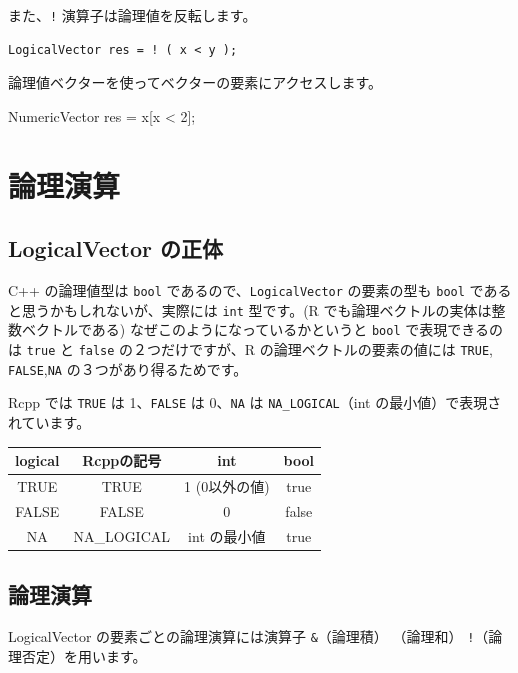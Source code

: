 \documentclass[]{book}
\newenvironment{Shaded}{\begin{snugshade}}{\end{snugshade}}
\newcommand{\DecValTok}[1]{\textcolor[rgb]{0.00,0.00,0.81}{#1}}
\newcommand{\NormalTok}[1]{#1}
\begin{document}
また、\texttt{!} 演算子は論理値を反転します。

\begin{verbatim}
LogicalVector res = ! ( x < y );
\end{verbatim}

論理値ベクターを使ってベクターの要素にアクセスします。

\begin{Shaded}
\begin{Highlighting}[]
\NormalTok{NumericVector res = x[x < }\DecValTok{2}\NormalTok{];}
\end{Highlighting}
\end{Shaded}

\chapter{論理演算}

\hypertarget{logicalvector-}{%
\section{LogicalVector の正体}\label{logicalvector-}}

C++ の論理値型は \texttt{bool} であるので、\texttt{LogicalVector} の要素の型も \texttt{bool} であると思うかもしれないが、実際には \texttt{int} 型です。(R でも論理ベクトルの実体は整数ベクトルである) なぜこのようになっているかというと \texttt{bool} で表現できるのは \texttt{true} と \texttt{false} の２つだけですが、R の論理ベクトルの要素の値には \texttt{TRUE}, \texttt{FALSE},\texttt{NA} の３つがあり得るためです。

Rcpp では \texttt{TRUE} は 1、\texttt{FALSE} は 0、\texttt{NA} は \texttt{NA\_LOGICAL}（int の最小値）で表現されています。

\begin{longtable}[]{@{}cccc@{}}
\toprule
logical & Rcppの記号 & int & bool\tabularnewline
\midrule
\endhead
TRUE & TRUE & 1 (0以外の値) & true\tabularnewline
FALSE & FALSE & 0 & false\tabularnewline
NA & NA\_LOGICAL & int の最小値 & true\tabularnewline
\bottomrule
\end{longtable}

\hypertarget{-1}{%
\section{論理演算}\label{-1}}

LogicalVector の要素ごとの論理演算には演算子 \texttt{\&}（論理積） \texttt{\textbar{}}（論理和） \texttt{!}（論理否定）を用います。
\end{document}
